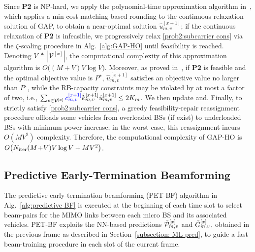 \documentclass[conference, a4paper]{IEEEtran}
\newcommand{\rev}[1]{\textcolor{revisioncolor}{{}#1}}
\newif\ifshowdeletions
\newcommand{\currentdel}[1]{\ifshowdeletions\textcolor{deletioncolor}{\sout{#1}}\fi}
\theoremstyle{remark}
\begin{document}
Since \textbf{P2} is NP-hard, we apply the polynomial-time approximation algorithm in~\cite{shmoys1993approximation}, which applies a min-cost-matching-based rounding to the continuous relaxation solution of GAP, to obtain a near-optimal solution $\hat{u}_{m,v}^{[x+1]}$; if the continuous relaxation of \textbf{P2} is infeasible, we progressively relax \eqref{prob2:subcarrier cons} via the $\zeta$-scaling procedure in Alg.~\ref{alg:GAP-HO} until feasibility is reached. Denoting $V\triangleq|\mathcal{V}^{[x]}|$, the computational complexity of this approximation algorithm is $O\big((M\!+\!V)V\log V\big)$. Moreover, as proved in~\cite{shmoys1993approximation}, if \textbf{P2} is feasible and the optimal objective value is $P^{\star}$, $\hat{u}_{m,v}^{[x+1]}$ satisfies an objective value no larger than $P^{\star}$, while the RB-capacity constraints may be violated by at most a factor of two, i.e., $\sum_{v\in\mathcal{V}^{[x]}}\rev{c_{m,v}^{[x+1]}}\Tilde{k}_{m,v}^{[x+1]}\hat{u}_{m,v}^{[x+1]}\le 2K_m$. We then update \currentdel{$\Tilde{k}_{m}^{[x+1]}=\sum_{v\in\mathcal{V}^{[x]}}\Tilde{k}_{m,v}^{[x+1]}\hat{u}_{m,v}^{[x+1]}$} and\currentdel{ iterate until $\{\Tilde{k}_{m}^{[x+1]}\}$ converges or the maximum iteration number $N_{\rm iter}$ (set to $3$ in this paper) is reached}. 
Finally, to strictly satisfy \eqref{prob2:subcarrier cons}, a greedy feasibility-repair reassignment procedure offloads some vehicles from overloaded BSs (if exist) to underloaded BSs with minimum power increase; in the worst case, this reassignment incurs $O(MV^2)$ complexity. Therefore, the computational complexity of GAP-HO is
$O\!\left(N_{\rm iter}(M\!+\!V)V\log V + MV^2\right)$.

\subsection{Predictive Early-Termination Beamforming}
\label{subsection:PET-BF}

The predictive early-termination beamforming (PET-BF) algorithm in Alg.~\ref{alg:predictive BF} is executed at the beginning of each time slot to select beam-pairs for the MIMO links between each micro BS and its associated vehicles. PET-BF exploits the NN-based predictions $\Tilde{\mathcal{P}}_{m,v}^{[x]}$ and $\Tilde{G}_{m,v}^{[x]}$, obtained in the previous frame as described in Section~\ref{subsection: ML pred}, to guide a fast beam-training procedure in each slot of the current frame.
\end{document}
